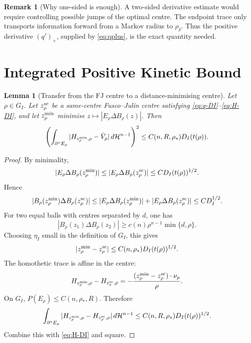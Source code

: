 \documentclass[11pt]{article}
\newtheorem{lemma}[theorem]{Lemma}
\theoremstyle{definition}
\newtheorem{remark}[theorem]{Remark}
\newcommand{\HH}{\mathcal H}
\newcommand{\rstar}{\rho_*}
\begin{document}
\begin{remark}[Why one-sided is enough]
A two-sided derivative estimate would require controlling possible jumps of
the optimal centre.  The endpoint trace only transports information forward
from a Markov radius to \(\rho_\delta\).  Thus the positive derivative
\((q')_+\), supplied by \eqref{eq:qplus}, is the exact quantity needed.
\end{remark}

\section{Integrated Positive Kinetic Bound}

\begin{lemma}[Transfer from the FJ centre to a distance-minimising centre]
\label{lem:center-transfer}
Let \(\rho\in G_I\).  Let \(z_\rho^{\rm sc}\) be a same-centre
Fusco--Julin centre satisfying \eqref{eq:q-DI}--\eqref{eq:H-DI}, and let
\(z_\rho^{\rm min}\) minimise \(z\mapsto |E_\rho\Delta B_\rho(z)|\).  Then
\begin{equation}\label{eq:H-DI-min}
   \left(
   \int_{\partial^*E_\rho}
      |H_{z_\rho^{\rm min},\rho}-\bar V_\rho|\,d\HH^{n-1}
   \right)^2
   \le C(n,R,\rstar)D_I(t(\rho)).
\end{equation}
\end{lemma}

\begin{proof}
By minimality,
\[
   |E_\rho\Delta B_\rho(z_\rho^{\rm min})|
   \le |E_\rho\Delta B_\rho(z_\rho^{\rm sc})|
   \le C D_I(t(\rho))^{1/2}.
\]
Hence
\[
   |B_\rho(z_\rho^{\rm min})\Delta B_\rho(z_\rho^{\rm sc})|
   \le
   |E_\rho\Delta B_\rho(z_\rho^{\rm min})|
   +|E_\rho\Delta B_\rho(z_\rho^{\rm sc})|
   \le C D_I^{1/2}.
\]
For two equal balls with centres separated by \(d\), one has
\[
   |B_\rho(z_1)\Delta B_\rho(z_2)|
   \ge c(n)\rho^{n-1}\min\{d,\rho\}.
\]
Choosing \(\eta_I\) small in the definition of \(G_I\), this gives
\[
   |z_\rho^{\rm min}-z_\rho^{\rm sc}|
   \le C(n,\rstar)D_I(t(\rho))^{1/2}.
\]
The homothetic trace is affine in the centre:
\[
   H_{z_\rho^{\rm min},\rho}-H_{z_\rho^{\rm sc},\rho}
   =
   -\frac{(z_\rho^{\rm min}-z_\rho^{\rm sc})\cdot\nu_\rho}{\rho}.
\]
On \(G_I\), \(P(E_\rho)\le C(n,\rstar,R)\).  Therefore
\[
   \int_{\partial^*E_\rho}
      |H_{z_\rho^{\rm min},\rho}-H_{z_\rho^{\rm sc},\rho}|\,d\HH^{n-1}
   \le C(n,R,\rstar)D_I(t(\rho))^{1/2}.
\]
Combine this with \eqref{eq:H-DI} and square.
\end{proof}
\end{document}

